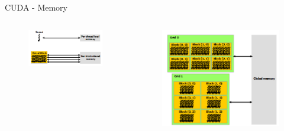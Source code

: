 \documentclass{beamer}
\begin{document}
\begin{frame}{CUDA - Memory}
   \begin{columns}
  
   \begin{column}{0.4\textwidth}
   
    \begin{figure}
      \centering
   
      \includegraphics[width=1.0\linewidth]{Images/local_memory.png}
    \end{figure}
    
    
   \end{column}
  \begin{column}{0.6\textwidth}
  
   \begin{figure}
      \centering
   
      \includegraphics[width=1.0\linewidth]{Images/global_memory.png}
    \end{figure}
  \end{column}

   
  \end{columns}
\end{frame}
\end{document}
